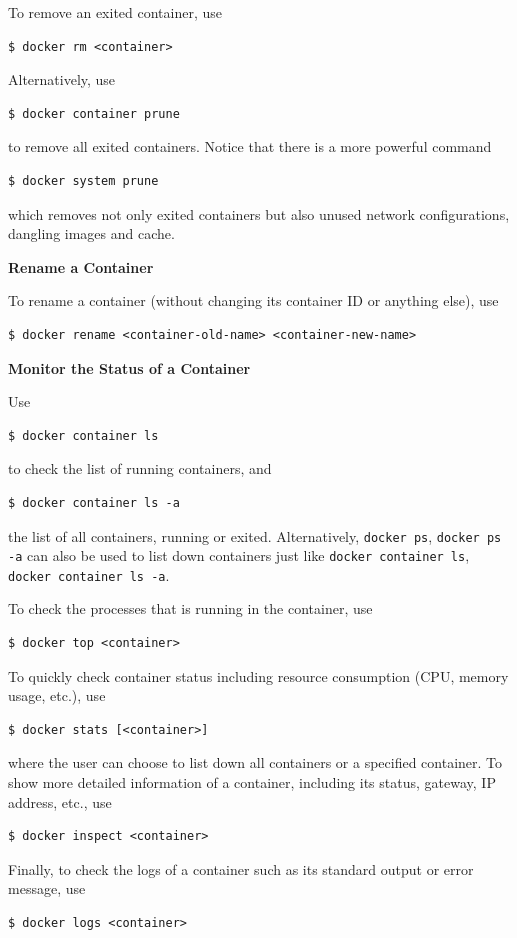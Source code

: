 To remove an exited container, use
\begin{lstlisting}
$ docker rm <container>
\end{lstlisting}
Alternatively, use
\begin{lstlisting}
$ docker container prune
\end{lstlisting}
to remove all exited containers. Notice that there is a more powerful command
\begin{lstlisting}
$ docker system prune
\end{lstlisting}
which removes not only exited containers but also unused network configurations, dangling images and cache.

\vspace{0.1in}
\noindent \textbf{Rename a Container}
\vspace{0.1in}

To rename a container (without changing its container ID or anything else), use
\begin{lstlisting}
$ docker rename <container-old-name> <container-new-name>
\end{lstlisting}

\vspace{0.1in}
\noindent \textbf{Monitor the Status of a Container}
\vspace{0.1in}

Use
\begin{lstlisting}
$ docker container ls
\end{lstlisting}
to check the list of running containers, and
\begin{lstlisting}
$ docker container ls -a
\end{lstlisting}
the list of all containers, running or exited. Alternatively, \verb|docker ps|, \verb|docker ps -a| can also be used to list down containers just like \verb|docker container ls|, \verb|docker container ls -a|.

To check the processes that is running in the container, use
\begin{lstlisting}
$ docker top <container>
\end{lstlisting}

To quickly check container status including resource consumption (CPU, memory usage, etc.), use
\begin{lstlisting}
$ docker stats [<container>]
\end{lstlisting}
where the user can choose to list down all containers or a specified container. To show more detailed information of a container, including its status, gateway, IP address, etc., use
\begin{lstlisting}
$ docker inspect <container>
\end{lstlisting}
Finally, to check the logs of a container such as its standard output or error message, use
\begin{lstlisting}
$ docker logs <container>
\end{lstlisting}

